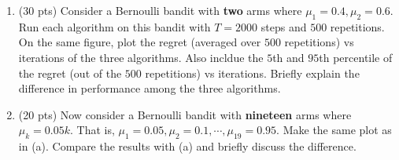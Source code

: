 \documentclass{article}
\begin{document}
\begin{enumerate}[a]
    \item (30 pts) Consider a Bernoulli bandit with \textbf{two} arms where $\mu_1=0.4, \mu_2=0.6$. Run each algorithm on this bandit with $T=2000$ steps and $500$ repetitions. On the same figure, plot the regret (averaged over $500$ repetitions) vs iterations of the three algorithms. Also incldue the $5$th and $95$th percentile of the regret (out of the $500$ repetitions) vs iterations. Briefly explain the difference in performance among the three algorithms.
    
    \item (20 pts) Now consider a Bernoulli bandit with \textbf{nineteen} arms where $\mu_k=0.05k$. That is, $\mu_1 = 0.05, \mu_2 = 0.1, \cdots, \mu_{19} = 0.95$. Make the same plot as in (a). Compare the results with (a) and briefly discuss the difference.
\end{enumerate}

\end{document}

